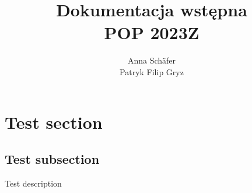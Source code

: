 \documentclass[titlepage]{article}
\title {
    {
        \huge Dokumentacja wstępna
    } \\
    POP 2023Z
}
\author {
    Anna Schäfer  \\
    Patryk Filip Gryz
}
\begin{document}
    \maketitle

    \newpage

    \tableofcontents

    \newpage

    \section{
        Test section
    }
        \subsection{
            Test subsection
        }
            Test description
\end{document}
